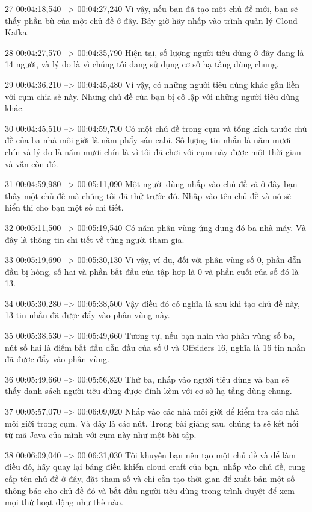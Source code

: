 27
00:04:18,540 --> 00:04:27,240
Vì vậy, nếu bạn đã tạo một chủ đề mới, bạn sẽ thấy phần bù của một chủ đề ở đây.  Bây giờ hãy nhấp vào trình quản lý Cloud Kafka.

28
00:04:27,570 --> 00:04:35,790
Hiện tại, số lượng người tiêu dùng ở đây đang là 14 người, và lý do là vì chúng tôi đang sử dụng cơ sở hạ tầng dùng chung.

29
00:04:36,210 --> 00:04:45,480
Vì vậy, có những người tiêu dùng khác gắn liền với cụm chia sẻ này.  Nhưng chủ đề của bạn bị cô lập với những người tiêu dùng khác.

30
00:04:45,510 --> 00:04:59,790
Có một chủ đề trong cụm và tổng kích thước chủ đề của ba nhà môi giới là năm phẩy sáu cabi.  Số lượng tin nhắn là năm mươi chín và lý do là năm mươi chín là vì tôi đã chơi với cụm này được một thời gian và vẫn còn đó.

31
00:04:59,980 --> 00:05:11,090
Một người dùng nhấp vào chủ đề và ở đây bạn thấy một chủ đề mà chúng tôi đã thử trước đó.  Nhấp vào tên chủ đề và nó sẽ hiển thị cho bạn một số chi tiết.

32
00:05:11,500 --> 00:05:19,540
Có năm phân vùng ứng dụng đó ba nhà máy.  Và đây là thông tin chi tiết về từng người tham gia.

33
00:05:19,690 --> 00:05:30,130
Vì vậy, ví dụ, đối với phân vùng số 0, phần dẫn đầu bị hỏng, số hai và phần bắt đầu của tập hợp là 0 và phần cuối của số đó là 13.

34
00:05:30,280 --> 00:05:38,500
Vậy điều đó có nghĩa là sau khi tạo chủ đề này, 13 tin nhắn đã được đẩy vào phân vùng này.

35
00:05:38,530 --> 00:05:49,660
Tương tự, nếu bạn nhìn vào phân vùng số ba, nút số hai là điểm bắt đầu dẫn đầu của số 0 và Offsiders 16, nghĩa là 16 tin nhắn đã được đẩy vào phân vùng.

36
00:05:49,660 --> 00:05:56,820
Thứ ba, nhấp vào người tiêu dùng và bạn sẽ thấy danh sách người tiêu dùng được đính kèm với cơ sở hạ tầng dùng chung.

37
00:05:57,070 --> 00:06:09,020
Nhấp vào các nhà môi giới để kiểm tra các nhà môi giới trong cụm.  Và đây là các nút.  Trong bài giảng sau, chúng ta sẽ kết nối từ mã Java của mình với cụm này như một bài tập.

38
00:06:09,040 --> 00:06:31,030
Tôi khuyên bạn nên tạo một chủ đề và để làm điều đó, hãy quay lại bảng điều khiển cloud craft của bạn, nhấp vào chủ đề, cung cấp tên chủ đề ở đây, đặt tham số và chỉ cần tạo thời gian để xuất bản một số thông báo cho chủ đề đó và bắt đầu người tiêu dùng trong  trình duyệt để xem mọi thứ hoạt động như thế nào.

